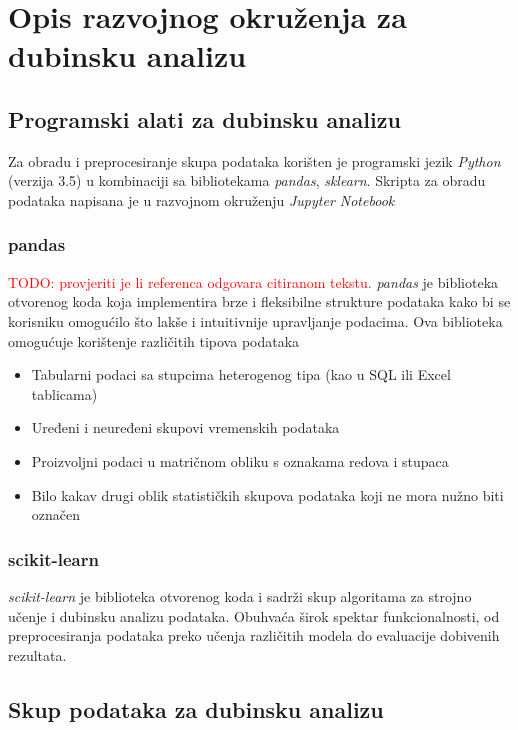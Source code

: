 \section{Opis razvojnog okruženja za dubinsku analizu}
\label{ch:ch2}

\subsection{Programski alati za dubinsku analizu}
Za obradu i preprocesiranje skupa podataka korišten je programski jezik \textit{Python} (verzija 3.5)
u kombinaciji sa bibliotekama \textit{pandas}, \textit{sklearn}. Skripta za obradu podataka napisana 
je u razvojnom okruženju \textit{Jupyter Notebook}

\subsubsection*{pandas}
\textcolor{red}{TODO: provjeriti je li referenca odgovara citiranom tekstu.}
\textit{pandas} je biblioteka otvorenog koda koja implementira brze i fleksibilne strukture podataka kako bi se korisniku omogućilo što lakše i intuitivnije upravljanje podacima\cite{McKinney01}. Ova biblioteka omogućuje korištenje različitih tipova podataka
\begin{itemize}
   \item Tabularni podaci sa stupcima heterogenog tipa (kao u SQL ili Excel tablicama)
   \item Uređeni i neuređeni skupovi vremenskih podataka
   \item Proizvoljni podaci u matričnom obliku s oznakama redova i stupaca
   \item Bilo kakav drugi oblik statističkih skupova podataka koji ne mora nužno biti označen
\end{itemize}

\subsubsection*{scikit-learn}
\textit{scikit-learn} je biblioteka otvorenog koda i sadrži skup algoritama za strojno učenje i dubinsku analizu podataka\cite{Pedregosa01}. Obuhvaća širok spektar funkcionalnosti, od preprocesiranja podataka preko učenja različitih modela do evaluacije dobivenih rezultata.

\subsection{Skup podataka za dubinsku analizu}

